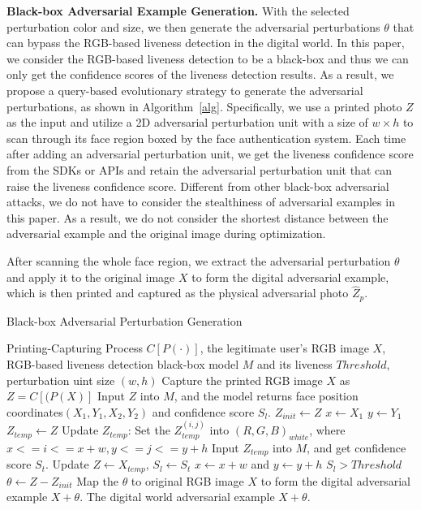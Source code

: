 \textbf{Black-box Adversarial Example Generation.}
With the selected perturbation color and size, we then generate the adversarial perturbations $\theta$ that can bypass the RGB-based liveness detection in the digital world.
In this paper, we consider the RGB-based liveness detection to be a black-box and thus we can only get the confidence scores of the liveness detection results. As a result, we propose a query-based evolutionary strategy to generate the adversarial perturbations, as shown in Algorithm~\ref{alg}.
Specifically, we use a printed photo $Z$ as the input and utilize a 2D adversarial perturbation unit with a size of $w\times h$  to scan through its face region boxed by the face authentication system. Each time after adding an adversarial perturbation unit, we get the liveness confidence score from the SDKs or APIs and retain the adversarial perturbation unit that can raise the liveness confidence score. 
Different from other black-box adversarial attacks, we do not have to consider the stealthiness of adversarial examples in this paper. As a result, we do not consider the shortest distance between the adversarial example and the original image during optimization. 

After scanning the whole face region, we extract the adversarial perturbation $\theta$ and apply it to the original image $X$ to form the digital adversarial example,  which is then printed and captured as the physical adversarial photo $\widehat{Z}_p$. 

\begin{algorithm}[t]
	\renewcommand{\algorithmicrequire}{\textbf{Input:}}
	\renewcommand{\algorithmicensure}{\textbf{Output:}}
	\caption{Black-box Adversarial Perturbation Generation}
	\label{alg}
	\begin{algorithmic}[1]
		\REQUIRE Printing-Capturing Process $C[P(\cdot)]$, the legitimate user's RGB image $X$, RGB-based liveness detection black-box model $M$ and its liveness  $Threshold$, perturbation uint size $(w, h)$
		\STATE Capture the printed RGB image $X$ as $Z = C[(P(X)]$
		\STATE Input $Z$ into $M$, and the model returns  face position coordinates$(X_1,Y_1,X_2,Y_2)$ and confidence score $S_l$. 
		\STATE $Z_{init} \leftarrow Z$
		\STATE $x \leftarrow X_1$
		\STATE $y \leftarrow Y_1$
		\REPEAT
		\STATE $Z_{temp} \leftarrow Z$
		\STATE Update $Z_{temp}$: Set the $Z_{temp}^{(i,j)}$ into $(R,G,B)_{white}$, where $x<=i<=x+w,y<=j<=y+h$
		\STATE Input $Z_{temp}$ into $M$, and get confidence score $S_t$. 
		\STATE Update $Z \leftarrow X_{temp}$, $S_l \leftarrow S_t$
		\ENDIF
		\STATE $x \leftarrow x+w$ and  $y \leftarrow y+h$
		\UNTIL $S_l>Threshold$
		\STATE $\theta \leftarrow Z-Z_{init}$
		\STATE Map the $\theta$ to original RGB image $X$ to form the digital adversarial example $X + \theta$.
		\ENSURE The digital world adversarial example $X + \theta$.
	\end{algorithmic}
\end{algorithm}
\vspace{-0.1in}  

